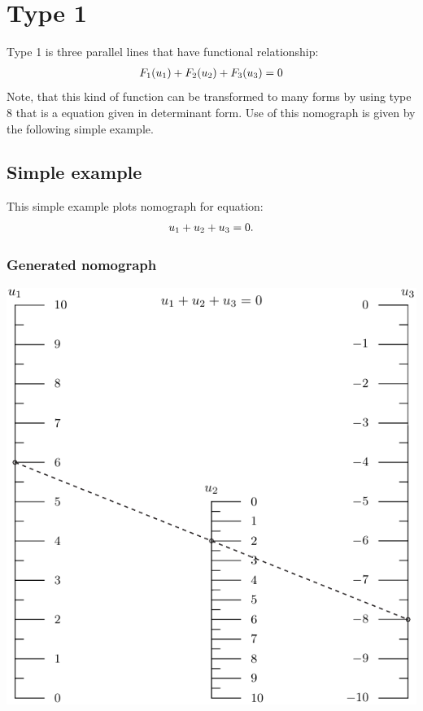 \documentclass[a4paper,11pt,english]{sphinxmanual}
\begin{document}
\section{Type 1}
\label{types/types:type1-ref}\label{types/types:type-1}
Type 1 is three parallel lines that have functional relationship:
\begin{gather}
\begin{split}F_1(u_1)+F_2(u_2)+F_3(u_3)=0\end{split}\notag
\end{gather}
Note, that this kind of function can be transformed to many forms by using type 8 that
is a equation given in determinant form. Use of this nomograph is given by the following
simple example.


\subsection{Simple example}
\label{types/types:simple-example}
This simple example plots nomograph for equation:
\begin{gather}
\begin{split}u_1 + u_2 + u_3 = 0.\end{split}\notag
\end{gather}

\subsubsection{Generated nomograph}
\label{types/types:generated-nomograph}
\includegraphics{ex_type1_nomo_1.pdf}
\end{document}
